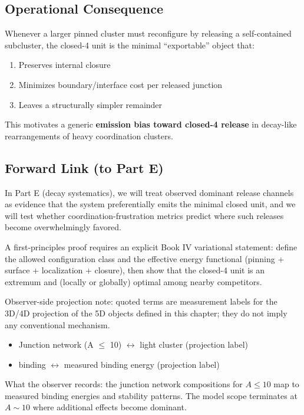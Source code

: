 \subsection{Operational Consequence}

Whenever a larger pinned cluster must reconfigure by releasing a self-contained
subcluster, the closed-4 unit is the minimal ``exportable'' object that:
\begin{enumerate}
    \item Preserves internal closure
    \item Minimizes boundary/interface cost per released junction
    \item Leaves a structurally simpler remainder
\end{enumerate}

This motivates a generic \textbf{emission bias toward closed-4 release}
in decay-like rearrangements of heavy coordination clusters. \tagP

\subsection{Forward Link (to Part E)}

In Part E (decay systematics), we will treat observed dominant release
channels as evidence that the system preferentially emits the minimal
closed unit, and we will test whether coordination-frustration metrics
predict where such releases become overwhelmingly favored.
\tagP

\begin{edcopenbox}[title=Open: Variational Proof]
    A first-principles proof requires an explicit Book IV variational statement:
    define the allowed configuration class and the effective energy functional
    (pinning + surface + localization + closure), then show that the closed-4
    unit is an extremum and (locally or globally) optimal among nearby competitors.
    \tagOpen
\end{edcopenbox}


\begin{observerbox}
Observer-side projection note: quoted terms are measurement labels for the
3D/4D projection of the 5D objects defined in this chapter; they do not
imply any conventional mechanism.

\begin{itemize}
    \item Junction network (A $\leq$ 10) $\leftrightarrow$ light cluster (projection label)
    \item \ClusterState{} binding $\leftrightarrow$ measured binding energy (projection label)
\end{itemize}

What the observer records: the junction network compositions for $A \leq 10$
map to measured binding energies and stability patterns. The model scope
terminates at $A \sim 10$ where additional effects become dominant.
\end{observerbox}

